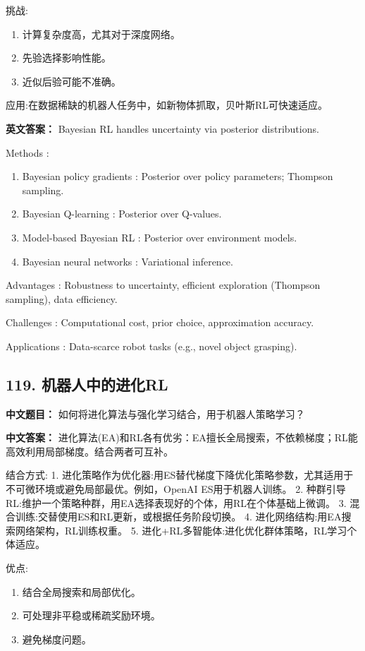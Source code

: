 \documentclass[10pt,a4paper]{ctexart}
\begin{document}
 挑战:
\begin{enumerate}
    \item 计算复杂度高，尤其对于深度网络。
    \item 先验选择影响性能。
    \item 近似后验可能不准确。
\end{enumerate}

 应用:在数据稀缺的机器人任务中，如新物体抓取，贝叶斯RL可快速适应。

\textbf{英文答案：}  
Bayesian RL handles uncertainty via posterior distributions.

 Methods :
\begin{enumerate}
    \item Bayesian policy gradients : Posterior over policy parameters; Thompson sampling.
    \item Bayesian Q-learning : Posterior over Q-values.
    \item Model-based Bayesian RL : Posterior over environment models.
    \item Bayesian neural networks : Variational inference.
\end{enumerate}

 Advantages : Robustness to uncertainty, efficient exploration (Thompson sampling), data efficiency.

 Challenges : Computational cost, prior choice, approximation accuracy.

 Applications : Data-scarce robot tasks (e.g., novel object grasping).

\subsection*{119. 机器人中的进化RL}
\textbf{中文题目：} 如何将进化算法与强化学习结合，用于机器人策略学习？

\textbf{中文答案：}  
进化算法(EA)和RL各有优劣：EA擅长全局搜索，不依赖梯度；RL能高效利用局部梯度。结合两者可互补。

 结合方式:
1.  进化策略作为优化器:用ES替代梯度下降优化策略参数，尤其适用于不可微环境或避免局部最优。例如，OpenAI ES用于机器人训练。
2.  种群引导RL:维护一个策略种群，用EA选择表现好的个体，用RL在个体基础上微调。
3.  混合训练:交替使用ES和RL更新，或根据任务阶段切换。
4.  进化网络结构:用EA搜索网络架构，RL训练权重。
5.  进化+RL多智能体:进化优化群体策略，RL学习个体适应。

 优点:
\begin{enumerate}
    \item 结合全局搜索和局部优化。
    \item 可处理非平稳或稀疏奖励环境。
    \item 避免梯度问题。
\end{enumerate}
\end{document}
